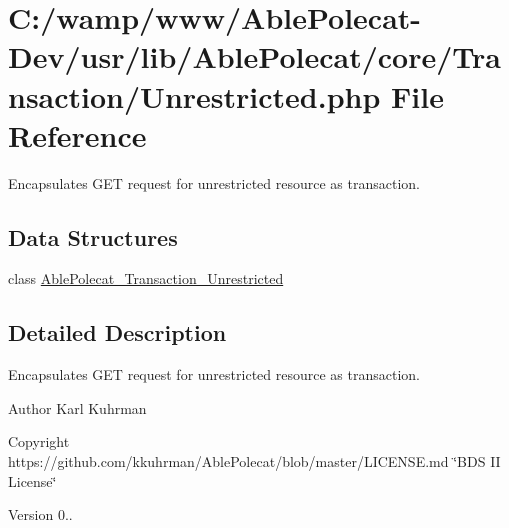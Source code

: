 \hypertarget{_unrestricted_8php}{}\section{C\+:/wamp/www/\+Able\+Polecat-\/\+Dev/usr/lib/\+Able\+Polecat/core/\+Transaction/\+Unrestricted.php File Reference}
\label{_unrestricted_8php}


Encapsulates G\+E\+T request for unrestricted resource as transaction.  


\subsection*{Data Structures}
\begin{DoxyCompactItemize}
\item 
class \hyperlink{class_able_polecat___transaction___unrestricted}{Able\+Polecat\+\_\+\+Transaction\+\_\+\+Unrestricted}
\end{DoxyCompactItemize}


\subsection{Detailed Description}
Encapsulates G\+E\+T request for unrestricted resource as transaction. 

\begin{DoxyAuthor}{Author}
Karl Kuhrman 
\end{DoxyAuthor}
\begin{DoxyCopyright}{Copyright}
https\+://github.com/kkuhrman/\+Able\+Polecat/blob/master/\+L\+I\+C\+E\+N\+S\+E.\+md \char`\"{}\+B\+D\+S I\+I License\char`\"{} 
\end{DoxyCopyright}
\begin{DoxyVersion}{Version}
0.. 
\end{DoxyVersion}
